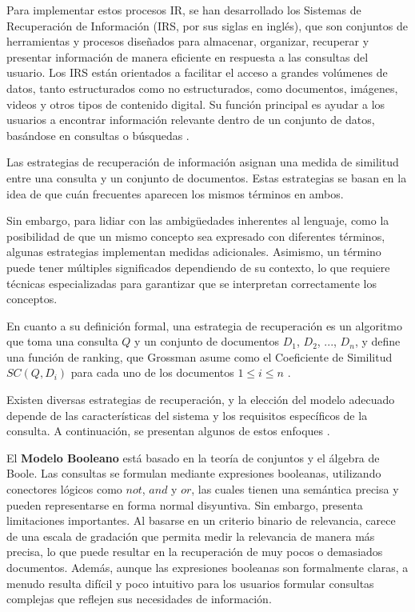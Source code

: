 Para implementar estos procesos IR, se han desarrollado los Sistemas de Recuperación 
de Información (IRS, por sus siglas en inglés), que son conjuntos de herramientas 
y procesos diseñados para almacenar, organizar, recuperar y presentar información 
de manera eficiente en respuesta a las consultas del usuario. Los IRS están orientados 
a facilitar el acceso a grandes volúmenes de datos, tanto estructurados como no estructurados, 
como documentos, imágenes, videos y otros tipos de contenido digital. Su función principal 
es ayudar a los usuarios a encontrar información relevante dentro de un conjunto de datos, 
basándose en consultas o búsquedas \cite{Ceri2013}.

Las estrategias de recuperación de información asignan una medida de similitud 
entre una consulta y un conjunto de documentos. Estas estrategias se basan en 
la idea de que cuán frecuentes aparecen los mismos términos en ambos.

Sin embargo, para lidiar con las ambigüedades inherentes al lenguaje, como la 
posibilidad de que un mismo concepto sea expresado con diferentes términos, 
algunas estrategias implementan medidas adicionales. Asimismo, un término puede 
tener múltiples significados dependiendo de su contexto, lo que requiere técnicas 
especializadas para garantizar que se interpretan correctamente los conceptos.

En cuanto a su definición formal, una estrategia de recuperación es un algoritmo 
que toma una consulta $Q$ y un conjunto de documentos $D_{1}$, $D_{2}$, ..., $D_{n}$, 
y define una función de ranking, que Grossman asume como el Coeficiente de Similitud 
$SC(Q, D_{i})$ para cada uno de los documentos $1 \leq i \leq n$ \cite{Grossman2004}.

Existen diversas estrategias de recuperación, y la elección del modelo adecuado 
depende de las características del sistema y los requisitos específicos de la consulta. 
A continuación, se presentan algunos de estos enfoques \cite{Baeza1999}.

El \textbf{Modelo Booleano} está basado en la teoría de conjuntos y el álgebra 
de Boole. Las consultas se formulan mediante expresiones booleanas, utilizando 
conectores lógicos como $not$, $and$ y $or$, las cuales tienen una semántica precisa 
y pueden representarse en forma normal disyuntiva. Sin embargo, presenta limitaciones 
importantes. Al basarse en un criterio binario de relevancia, carece de una escala 
de gradación que permita medir la relevancia de manera más precisa, lo que puede 
resultar en la recuperación de muy pocos o demasiados documentos. Además, aunque 
las expresiones booleanas son formalmente claras, a menudo resulta difícil y poco 
intuitivo para los usuarios formular consultas complejas que reflejen sus 
necesidades de información.

